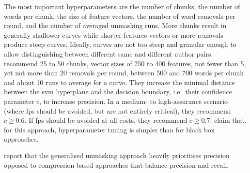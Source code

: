 The most important hyperparameters are the number of chunks, the number of words per chunk, the size of feature vectors, 
the number of word removals per round, and the number of averaged unmasking runs.
More chunks result in generally shallower curves while shorter features vectors or more removals produce steep curves.
Ideally, curves are not too steep and granular enough to allow distinguishing between different same and different author pairs.
\citet{bevendorff_bias_2019} recommend 25 to 50 chunks, vector sizes of 250 to 400 features, not fewer than 5, yet not more than 20 removals per round, 
between 500 and 700 words per chunk and about 10 runs to average for a curve.
They increase the minimal distance between the \ac{svm} hyperplane and the decision boundary, i.e.\ their confidence parameter $c$, to increase precision.
In a medium- to high-assurance scenario (where \acp{fp} should be avoided, but are not entirely critical), they recommend $c \geq 0.6$.
If \acp{fp} should be avoided at all costs, they recommend $c \geq 0.7$.
\citet{bevendorff_bias_2019} claim that, for this approach, hyperparameter tuning is simpler than for black box approaches.

\citet{bevendorff_bias_2019} report that the generalised unmasking approach heavily prioritises precision 
opposed to compression-based approaches that balance precision and recall.
    